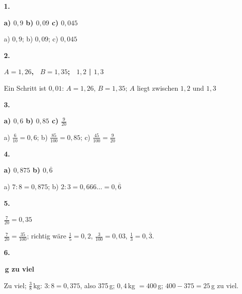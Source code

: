 \documentclass[11pt]{article}
\newcommand{\lsg}[3]{\par\noindent\begin{minipage}[t]{9mm}\textbf{#1}\end{minipage}%
  \begin{minipage}[t]{52mm}\raggedright\bfseries\boldmath #2\end{minipage}\hspace{3mm}%
  \begin{minipage}[t]{\dimexpr\linewidth-64mm\relax}\raggedright\small #3\end{minipage}\par\vspace{4pt}}
\begin{document}
\par\Needspace{25mm}\vspace{6pt}\noindent\colorbox{black!12}{}\hspace{2mm}{\bfseries Probetest}\par\vspace{4pt}
\lsg{1.}{a) $0{,}9$ \quad b) $0{,}09$ \quad c) $0{,}045$}{a) $0{,}9$; b) $0{,}09$; c) $0{,}045$}
\lsg{2.}{$A = 1{,}26$, \ $B = 1{,}35$; \ $1{,}2$ | $1{,}3$}{Ein Schritt ist $0{,}01$: $A = 1{,}26$, $B = 1{,}35$; $A$ liegt zwischen $1{,}2$ und $1{,}3$}
\lsg{3.}{a) $0{,}6$ \quad b) $0{,}85$ \quad c) $\frac{9}{20}$}{a) $\frac{6}{10} = 0{,}6$; b) $\frac{85}{100} = 0{,}85$; c) $\frac{45}{100} = \frac{9}{20}$}
\lsg{4.}{a) $0{,}875$ \quad b) $0{,}\overline{6}$}{a) $7 : 8 = 0{,}875$; b) $2 : 3 = 0{,}666\ldots = 0{,}\overline{6}$}
\lsg{5.}{$\frac{7}{20} = 0{,}35$}{$\frac{7}{20} = \frac{35}{100}$; richtig wäre $\frac{1}{5} = 0{,}2$, $\frac{3}{100} = 0{,}03$, $\frac{1}{3} = 0{,}\overline{3}$.}
\lsg{6.}{25\,g zu viel}{Zu viel; $\frac{3}{8}$\,kg: $3 : 8 = 0{,}375$, also 375\,g; $0{,}4$\,kg $= 400$\,g; $400 - 375 = 25$\,g zu viel.}
\end{document}
